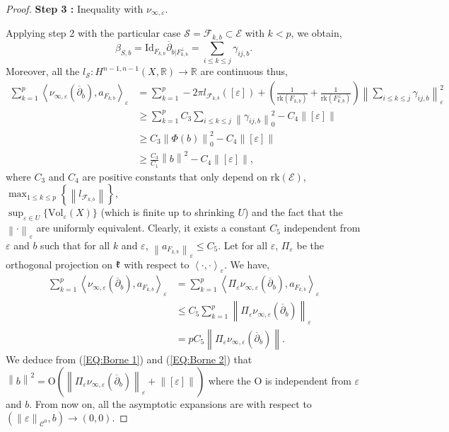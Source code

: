 \documentclass{article}
\theoremstyle{remark}
\theoremstyle{definition}
\newcommand{\R}{\mathbb{R}}
\newcommand{\rk}{\mathrm{rk}}
\newcommand{\Vol}{\mathrm{Vol}}
\newcommand{\Id}{\mathrm{Id}}
\newcommand{\scal}[2]{\left< #1,#2 \right>}
\newcommand{\norme}[1]{\left\| #1 \right\|}
\newcommand{\E}{\mathcal{E}}
\newcommand{\F}{\mathcal{F}}
\newcommand{\dbar}{\overline{\partial}}
\newcommand{\mC}{\mathcal{C}}
\renewcommand{\leq}{\leqslant}
\renewcommand{\geq}{\geqslant}
\begin{document}
\begin{proof}
\vspace{1mm}
\noindent\textbf{Step 3 :} Inequality with $\nu_{\infty,\varepsilon}$.
\vspace{1mm}

Applying step 2 with the particular case $\mathcal{S} = \F_{k,b} \subset \E$ with $k < p$, we obtain,
$$
\beta_{S,b} = \Id_{F_{k,b}}\dbar_{b|F_{k,b}^\bot} = \sum_{i \leq k \leq j} \gamma_{ij,b}.
$$
Moreover, all the $l_{\mathcal{S}} : H^{n - 1,n - 1}(X,\R) \rightarrow \R$ are continuous thus,
\begin{align}
    \sum_{k = 1}^p \scal{\nu_{\infty,\varepsilon}(\dbar_b)}{a_{F_{k,b}}}_\varepsilon & = \sum_{k = 1}^p -2\pi l_{\F_{k,b}}([\varepsilon]) + \left(\frac{1}{\rk(F_{k,b})} + \frac{1}{\rk(F_{k,b}^\bot)}\right)\norme{\sum_{i \leq k \leq j} \gamma_{ij,b}}_\varepsilon^2 \nonumber\\
    & \geq \sum_{k = 1}^p C_3\sum_{i \leq k \leq j} \norme{\gamma_{ij,b}}_0^2 - C_4\norme{[\varepsilon]} \nonumber\\
    & \geq C_3\norme{\Phi(b)}_0^2 - C_4\norme{[\varepsilon]} \nonumber\\
    & \geq \frac{C_3}{C_1}\norme{b}^2 - C_4\norme{[\varepsilon]}, \label{EQ:Borne 1}
\end{align}
where $C_3$ and $C_4$ are positive constants that only depend on $\rk(\E)$, $\max_{1 \leq k \leq p}\left\{\norme{l_{\F_{k,b}}}\right\}$,\\
$\sup_{\varepsilon \in U}\{\Vol_\varepsilon(X)\}$ (which is finite up to shrinking $U$) and the fact that the $\norme{\cdot}_\varepsilon$ are uniformly equivalent. Clearly, it exists a constant $C_5$ independent from $\varepsilon$ and $b$ such that for all $k$ and $\varepsilon$, $\norme{a_{F_{k,b}}}_\varepsilon \leq C_5$. Let for all $\varepsilon$, $\Pi_\varepsilon$ be the orthogonal projection on $\frak{k}$ with respect to $\scal{\cdot}{\cdot}_\varepsilon$. We have,
\begin{align}
    \sum_{k = 1}^p \scal{\nu_{\infty,\varepsilon}(\dbar_b)}{a_{F_{k,b}}}_\varepsilon & = \sum_{k = 1}^p \scal{\Pi_\varepsilon\nu_{\infty,\varepsilon}(\dbar_b)}{a_{F_{k,b}}}_\varepsilon \nonumber\\
    & \leq C_5\sum_{k = 1}^p \norme{\Pi_\varepsilon\nu_{\infty,\varepsilon}(\dbar_b)}_\varepsilon \nonumber\\
    & = pC_5\norme{\Pi_\varepsilon\nu_{\infty,\varepsilon}(\dbar_b)}. \label{EQ:Borne 2}
\end{align}
We deduce from (\ref{EQ:Borne 1}) and (\ref{EQ:Borne 2}) that $\norme{b}^2 = \mathrm{O}\!\left(\norme{\Pi_\varepsilon\nu_{\infty,\varepsilon}(\dbar_b)}_\varepsilon + \norme{[\varepsilon]}\right)$ where the $\mathrm{O}$ is independent from $\varepsilon$ and $b$. From now on, all the asymptotic expansions are with respect to $(\norme{\varepsilon}_{\mC^0},b) \rightarrow (0,0)$.


\end{proof}
\end{document}
